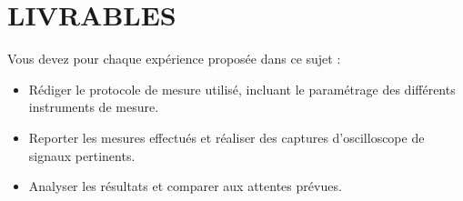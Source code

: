 \documentclass[a4paper,11pt]{article} %
\begin{document}
\section{LIVRABLES}

Vous devez pour chaque expérience proposée dans ce sujet :

\begin{itemize}
	\item Rédiger le protocole de mesure utilisé, incluant le paramétrage des différents instruments de mesure.
	\item Reporter les mesures effectués et réaliser des captures d'oscilloscope de signaux pertinents.
	\item Analyser les résultats et comparer aux attentes prévues.
\end{itemize}

\end{document}
